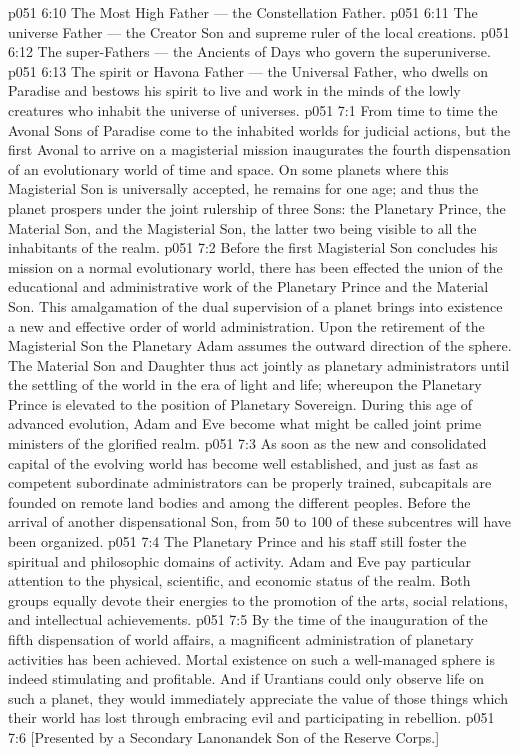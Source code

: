 \vs p051 6:10 \bibnobreakspace The Most High Father --- the Constellation Father.
\vs p051 6:11 \bibnobreakspace The universe Father --- the Creator Son and supreme ruler of the local creations.
\vs p051 6:12 \bibnobreakspace The super\hyp{}Fathers --- the Ancients of Days who govern the superuniverse.
\vs p051 6:13 \bibnobreakspace The spirit or Havona Father --- the Universal Father, who dwells on Paradise and bestows his spirit to live and work in the minds of the lowly creatures who inhabit the universe of universes.
\vs p051 7:1 From time to time the Avonal Sons of Paradise come to the inhabited worlds for judicial actions, but the first Avonal to arrive on a magisterial mission inaugurates the fourth dispensation of an evolutionary world of time and space. On some planets where this Magisterial Son is universally accepted, he remains for one age; and thus the planet prospers under the joint rulership of three Sons: the Planetary Prince, the Material Son, and the Magisterial Son, the latter two being visible to all the inhabitants of the realm.
\vs p051 7:2 Before the first Magisterial Son concludes his mission on a normal evolutionary world, there has been effected the union of the educational and administrative work of the Planetary Prince and the Material Son. This amalgamation of the dual supervision of a planet brings into existence a new and effective order of world administration. Upon the retirement of the Magisterial Son the Planetary Adam assumes the outward direction of the sphere. The Material Son and Daughter thus act jointly as planetary administrators until the settling of the world in the era of light and life; whereupon the Planetary Prince is elevated to the position of Planetary Sovereign. During this age of advanced evolution, Adam and Eve become what might be called joint prime ministers of the glorified realm.
\vs p051 7:3 As soon as the new and consolidated capital of the evolving world has become well established, and just as fast as competent subordinate administrators can be properly trained, subcapitals are founded on remote land bodies and among the different peoples. Before the arrival of another dispensational Son, from 50 to 100 of these subcentres will have been organized.
\vs p051 7:4 The Planetary Prince and his staff still foster the spiritual and philosophic domains of activity. Adam and Eve pay particular attention to the physical, scientific, and economic status of the realm. Both groups equally devote their energies to the promotion of the arts, social relations, and intellectual achievements.
\vs p051 7:5 By the time of the inauguration of the fifth dispensation of world affairs, a magnificent administration of planetary activities has been achieved. Mortal existence on such a well\hyp{}managed sphere is indeed stimulating and profitable. And if Urantians could only observe life on such a planet, they would immediately appreciate the value of those things which their world has lost through embracing evil and participating in rebellion.
\vsetoff
\vs p051 7:6 [Presented by a Secondary Lanonandek Son of the Reserve Corps.]
\quizlink
